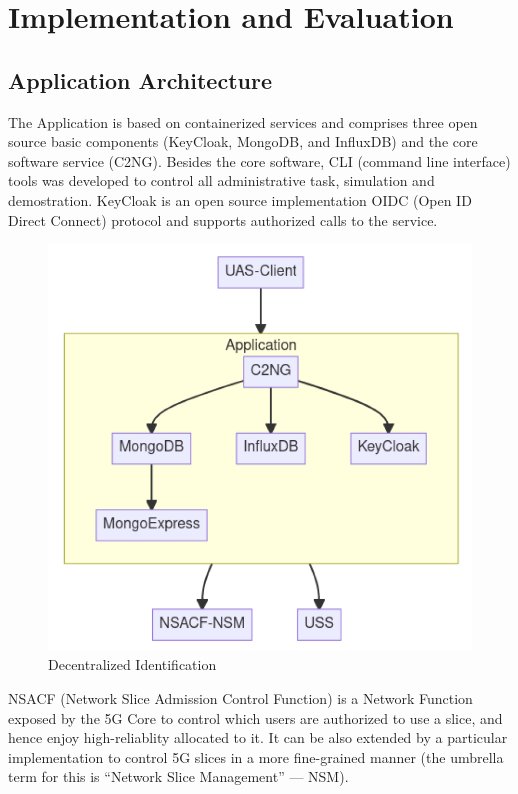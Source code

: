 \documentclass[a4paper,conference]{IEEEtran}
\begin{document}
\section{Implementation and Evaluation}

\subsection{Application Architecture}

The Application is based on containerized services and comprises three open source basic components (KeyCloak, MongoDB, and InfluxDB) and the core software service (C2NG). Besides the core software, CLI (command line interface) tools was developed to control all administrative task, simulation and demostration. KeyCloak is an open source implementation OIDC (Open ID Direct Connect) protocol and supports authorized calls to the service.

\begin{figure}[!ht]
\centering
\includegraphics[width=0.9\linewidth]{images/arch.png}
\caption{Decentralized Identification}\label{fig:arch}
\end{figure}

NSACF (Network Slice Admission Control Function) is a Network Function exposed by the 5G Core to control which users are authorized to use a slice, and hence enjoy high-reliablity allocated to it. It can be also extended by a particular implementation to control 5G slices in a more fine-grained manner (the umbrella term for this is “Network Slice Management” --- NSM).
\end{document}
